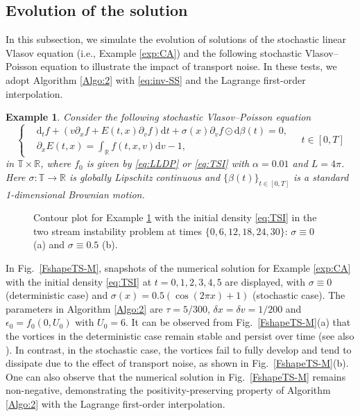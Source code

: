 \documentclass[11pt,reqno]{amsproc}
\newtheorem{example}[Def]{Example}
\newcommand{\ud}{\mathrm d}
\newcommand{\R}{\mathbb{R}}
\numberwithin{equation}{section}
\begin{document}
\subsection{Evolution of the solution}\label{S5.2}
In this subsection, we simulate the evolution of solutions of the stochastic linear Vlasov equation (i.e., Example \ref{exp:CA}) and the following stochastic Vlasov--Poisson equation to illustrate the impact of transport noise. In these tests, we adopt Algorithm \ref{Algo:2} with \eqref{eq:inv-SS} and the Lagrange first-order interpolation.
\begin{example}\label{exam:VP}
Consider the following stochastic Vlasov--Poisson equation
\begin{equation}\label{eq:VPtest}
\left\{
\begin{split}
	&\ud_tf +\left(v \partial_xf+E(t,x)\partial_vf\right)\ud t
	+\sigma(x)\partial_v f\odot \ud \beta(t)=0,\\
&\partial_{x} E(t,x)=\int_{\R}f(t,x,v)\ud v-1,
\end{split}
\right. \quad t\in[0,T]
\end{equation}
in $\mathbb{T}\times\R$, 
where $f_0$ is given by \eqref{eq:LLDP} or \eqref{eq:TSI} with $\alpha=0.01$ and $L=4\pi$. Here $\sigma:\mathbb{T}\to\R$ is globally Lipschitz continuous and $\{\beta(t)\}_{t\in[0,T]}$ is a standard 1-dimensional Brownian motion.
\end{example}

 \begin{figure}[htb]
 \centering
 \caption{Contour plot for Example \ref{exam:VP} with the initial density \eqref{eq:TSI} in the two stream instability problem at times $\{0,6,12,18,24,30\}$: $\sigma\equiv 0$ \textup{(}a\textup{)} and $\sigma\equiv 0.5$ \textup{(}b\textup{)}.}\label{VPshapeSTr}
\end{figure}


In Fig.\ \ref{FshapeTS-M}, snapshots of the numerical solution
 for Example \ref{exp:CA} with the initial density \eqref{eq:TSI} at $t= 0,1,2,3,4,5$ are displayed, with $\sigma\equiv 0$ (deterministic case) and $\sigma(x)=0.5(\cos(2\pi x)+1)$ (stochastic case).
 The parameters in Algorithm \ref{Algo:2} are $\tau=5/300$, $\delta x=\delta v=1/200$ and $\epsilon_0=f_0(0,U_0)$ with $U_0=6$. 
 It can be observed from Fig.\ \ref{FshapeTS-M}(a) that the vortices in the deterministic case remain stable and persist over time (see also \cite[Fig.\ 1]{BC24}).
In contrast, in the stochastic case, the vortices fail to fully develop and tend to dissipate due to the effect of transport noise, as shown in Fig.\ \ref{FshapeTS-M}(b). One can also observe that
the numerical solution in Fig.\ \ref{FshapeTS-M} remains non-negative, demonstrating the positivity-preserving property of Algorithm \ref{Algo:2} with the Lagrange first-order interpolation.
\end{document}
